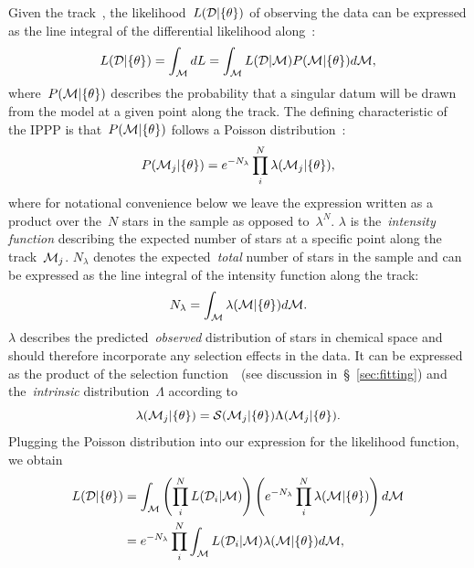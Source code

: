 \documentclass[ms.tex]{subfiles}
\begin{document}
\par
Given the track~, the likelihood~$L(\mathcal{D} | \{\theta\})$ of
observing the data can be expressed as the line integral of the differential
likelihood along~:
\begin{equation}
L(\mathcal{D} | \{\theta\}) = \int_{\mathcal{M}} dL =
\int_{\mathcal{M}} L(\mathcal{D} | \mathcal{M}) P(\mathcal{M} | \{\theta\})
d\mathcal{M},
\end{equation}
where~$P(\mathcal{M} | \{\theta\})$ describes the probability that a singular
datum will be drawn from the model at a given point along the track.
The defining characteristic of the IPPP is that~$P(\mathcal{M} | \{\theta\})$
follows a Poisson distribution~\citep{Press2007}:
\begin{equation}
P(\mathcal{M}_j | \{\theta\}) = e^{-N_\lambda}
\prod_i^N \lambda (\mathcal{M}_j | \{\theta\}),
\end{equation}
where for notational convenience below we leave the expression written as a
product over the~$N$ stars in the sample as opposed to~$\lambda^N$.
$\lambda$ is the~\textit{intensity function} describing the expected
number of stars at a specific point along the track~$\mathcal{M}_j$.
$N_\lambda$ denotes the expected~\textit{total} number of stars in the sample
and can be expressed as the line integral of the intensity function along the
track:
\begin{equation}
N_\lambda = \int_{\mathcal{M}} \lambda(\mathcal{M} | \{\theta\}) d\mathcal{M}.
\end{equation}
$\lambda$ describes the predicted~\textit{observed} distribution of stars in
chemical space and should therefore incorporate any selection effects in the
data.
It can be expressed as the product of the selection function~~(see
discussion in~\S~\ref{sec:fitting}) and the~\textit{intrinsic}
distribution~$\Lambda$ according to
\begin{equation}
\lambda(\mathcal{M}_j | \{\theta\}) = \mathcal{S}(\mathcal{M}_j | \{\theta\})
\Lambda(\mathcal{M}_j | \{\theta\}).
\end{equation}
Plugging the Poisson distribution into our expression for the likelihood
function, we obtain
\begin{subequations}\begin{align}
L(\mathcal{D} | \{\theta\}) &= \int_{\mathcal{M}}
\left(\prod_i^N L(\mathcal{D}_i | \mathcal{M})\right)
\left(e^{-N_\lambda} \prod_i^N \lambda(\mathcal{M} | \{\theta\})\right)
d\mathcal{M}
\\
&= e^{-N_\lambda} \prod_i^N \int_{\mathcal{M}} L(\mathcal{D}_i | \mathcal{M})
\lambda(\mathcal{M} | \{\theta\}) d\mathcal{M},
\end{align}\end{subequations}
\end{document}
